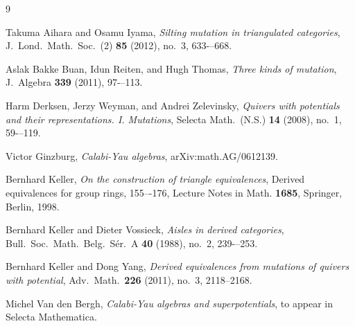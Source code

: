 \documentclass[a4paper,11pt]{amsart}
\theoremstyle{definition}
\numberwithin{theorem}{section}
\begin{document}
\begin{thebibliography}{9}

 Takuma Aihara and Osamu Iyama, \emph{Silting mutation in triangulated categories}, J.\ Lond.\ Math.\ Soc.\ (2) \textbf{85} (2012), no.\ 3, 633-–668.

Aslak Bakke Buan, Idun Reiten, and Hugh Thomas, \emph{Three kinds of mutation}, J.\ Algebra \textbf{339} (2011), 97-–113. 

 Harm Derksen, Jerzy Weyman, and Andrei Zelevinsky, \emph{Quivers with potentials and their representations. I. Mutations}, Selecta Math.\ (N.S.) \textbf{14} (2008), no.\ 1, 59-–119.

 Victor Ginzburg, \emph{Calabi-Yau algebras}, arXiv:math.AG/0612139.

 Bernhard Keller, \emph{On the construction of triangle equivalences}, Derived equivalences for group rings, 155–-176, Lecture Notes in Math. \textbf{1685}, Springer, Berlin, 1998. 

 Bernhard Keller and Dieter Vossieck, \emph{Aisles in derived categories}, Bull.\ Soc.\ Math.\ Belg.\ S{\'e}r.\ A \textbf{40} (1988), no.\ 2, 239-–253.

 Bernhard Keller and Dong Yang, \emph{Derived equivalences from mutations of quivers with potential}, Adv.\ Math.\ \textbf{226} (2011), no.\ 3, 2118--2168.

 Michel Van den Bergh, \emph{Calabi-Yau algebras and superpotentials}, to appear in Selecta Mathematica.

\end{thebibliography}
\end{document}
